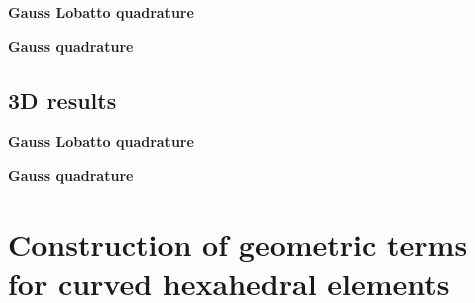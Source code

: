 \documentclass{svjour3}                     %
\begin{document}
\textbf{Gauss Lobatto quadrature}

\textbf{Gauss quadrature}


\subsection{3D results}
\textbf{Gauss Lobatto quadrature}

\textbf{Gauss quadrature}


\appendix

\section{Construction of geometric terms for curved hexahedral elements}
\label{app:A}





\end{document}
